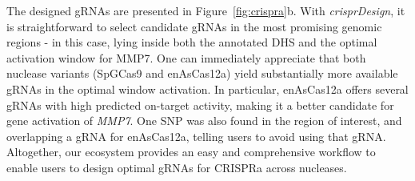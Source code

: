 \documentclass[pdftex,english,10pt]{article}
\begin{document}
The designed gRNAs are presented in Figure~\ref{fig:crispra}b. 
With \textit{crisprDesign}, it is straightforward to select candidate gRNAs in the most promising genomic regions - in this case, lying inside both the annotated DHS and the optimal activation window for MMP7. One can immediately appreciate that both nuclease variants (SpGCas9 and enAsCas12a) yield substantially more available gRNAs in the optimal window activation. In particular, enAsCas12a offers several gRNAs with high predicted on-target activity, making it a better candidate for gene activation of \textit{MMP7}. One SNP was also found in the region of interest, and overlapping a gRNA for enAsCas12a, telling users to avoid using that gRNA. Altogether, our ecosystem provides an easy and comprehensive workflow to enable users to design optimal gRNAs for CRISPRa across nucleases. 
\end{document}
